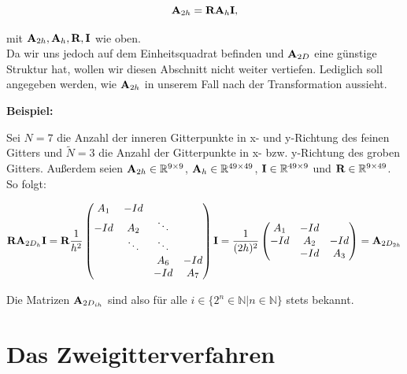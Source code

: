 \begin{equation}
{\textbf{A}}_{2h} = {\textbf{R}}{\textbf{A}}_{h}{\textbf{I}},
\end{equation}

mit ${\textbf{A}}_{2h},{\textbf{A}}_{h},{\textbf{R}},{\textbf{I}}$ wie oben.\\
Da wir uns jedoch auf dem Einheitsquadrat befinden und ${\textbf{A}}_{2D}$ eine günstige Struktur hat, wollen wir diesen Abschnitt nicht weiter vertiefen. Lediglich soll angegeben werden, wie ${\textbf{A}}_{2h}$ in unserem Fall nach der Transformation aussieht.

\textbf{Beispiel:}

Sei $N = 7$ die Anzahl der inneren Gitterpunkte in x- und y-Richtung des feinen Gitters und $\tilde N = 3$ die Anzahl der Gitterpunkte in x- bzw. y-Richtung des groben Gitters. Außerdem seien ${\textbf{A}}_{2h} \in \mathbb{R}^{9 \times 9}$, ${\textbf{A}}_{h} \in \mathbb{R}^{49 \times 49}$, ${\textbf{I}} \in \mathbb{R}^{49 \times 9}$ und ${\textbf{R}} \in \mathbb{R}^{9 \times 49}$. So folgt:

\begin{equation}
{\textbf{R}}{\textbf{A}}_{2D_{h}}{\textbf{I}} = {\textbf{R}} \frac{1}{h^{2}}
\begin{pmatrix}
A_{1} & -Id \\
-Id & A_{2} & \ddots \\
 & \ddots & \ddots \\
 & & A_{6} & -Id\\
 & & -Id & A_{7}
\end{pmatrix}
{\textbf{I}} = \frac{1}{(2h)^{2}}
\begin{pmatrix}
A_{1} & -Id \\
-Id & A_{2} & -Id \\
 & -Id & A_{3}
\end{pmatrix}
= {\textbf{A}}_{2D_{2h}}
\end{equation}

Die Matrizen ${\textbf{A}}_{2D_{ih}}$ sind also für alle $i \in \{2^{n} \in \mathbb{N} | n \in \mathbb{N} \}$ stets bekannt.

\section{Das Zweigitterverfahren}\label{s.Der Zweigitter-Algorithmus}

